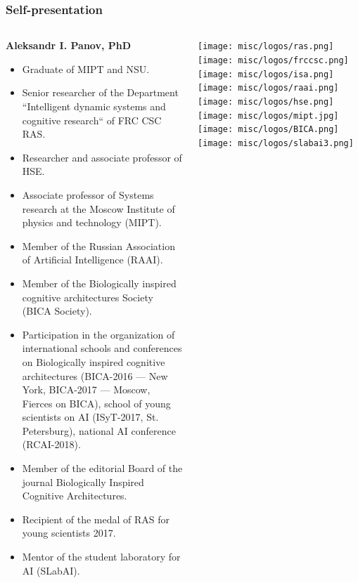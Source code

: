 \documentclass[default]{beamer}
\begin{document}
	\begin{frame}
		\frametitle{Self-presentation}
		\scriptsize
		\begin{columns}
			\begin{column}{0.85\textwidth}
				\textbf{Aleksandr I. Panov, PhD}
				\begin{itemize}
					\item Graduate of MIPT and NSU.
					\item Senior researcher of the Department ``Intelligent dynamic systems and cognitive research`` of FRC CSC RAS.
					\item Researcher and associate professor of HSE.
					\item Associate professor of Systems research at the Moscow Institute of physics and technology (MIPT).
					\item Member of the Russian Association of Artificial Intelligence (RAAI).
					\item Member of the Biologically inspired cognitive architectures Society (BICA Society).
					\item Participation in the organization of international schools and conferences on Biologically inspired cognitive architectures (BICA-2016 --- New York, BICA-2017 --- Moscow, Fierces on BICA), school of young scientists on AI (ISyT-2017, St. Petersburg), national AI conference (RCAI-2018).
					\item Member of the editorial Board of the journal Biologically Inspired Cognitive Architectures.
					\item Recipient of the medal of RAS for young scientists 2017.
					\item Mentor of the student laboratory for AI (SLabAI).
				\end{itemize}
			\end{column}
			
			\begin{column}{0.15\textwidth}
				\centering
				\texttt{[image: misc/logos/ras.png]}
				\vspace{7pt}
				\texttt{[image: misc/logos/frccsc.png]}
				\vspace{7pt}
				\texttt{[image: misc/logos/isa.png]}
				\vspace{7pt}
				\texttt{[image: misc/logos/raai.png]}
				\vspace{7pt}
				\texttt{[image: misc/logos/hse.png]}
				\vspace{7pt}
				\texttt{[image: misc/logos/mipt.jpg]}
				\vspace{5pt}
				\texttt{[image: misc/logos/BICA.png]}
				\vspace{5pt}
				\texttt{[image: misc/logos/slabai3.png]}
			\end{column}
			
		\end{columns}
	\end{frame}
\end{document}
